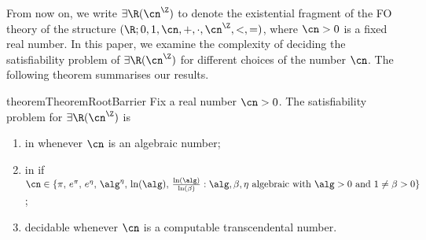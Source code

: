 From now on, we write $\exists\R(\ipow{\cn})$ to denote the existential fragment
of the FO theory of the structure $(\R; 0, 1, \cn, +, \cdot, \ipow{\cn}, <,=)$,
where $\cn > 0$ is a fixed real number. In this paper, we examine the complexity
of deciding the satisfiability problem of $\exists\R(\ipow{\cn})$ for different
choices of the number $\cn$. The following theorem summarises our results.

\begin{restatable}{theorem}{TheoremRootBarrier}
  \label{theorem:result-root-barrier}
    Fix a real number $\cn > 0$. The satisfiability problem for
    $\exists\R(\ipow{\cn})$ is
    \begin{enumerate}
      \item\label{theorem:result-root-barrier:point1} in \expspace whenever
      $\cn$ is an algebraic number;
      \item\label{theorem:result-root-barrier:point2} in \threeexptime if
        $\cn \in \{\pi,\, e^\pi,\, e^\eta,\, \alg^\eta,\, \ln(\alg),\, 
        \frac{\ln(\alg)}{\ln(\beta)} : \alg,\beta,\eta \text{ algebraic with } \alg > 0 \text{ and } 1 \neq \beta > 0\}$;
      \item\label{theorem:result-root-barrier:point3} decidable whenever $\cn$
      is a computable transcendental number.
    \end{enumerate}
    
\end{restatable}




